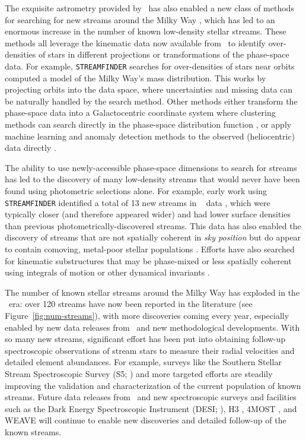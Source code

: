 \documentclass[final,5p,times,twocolumn,authoryear]{elsarticle}
\begin{document}
The exquisite astrometry provided by \gaia\ has also enabled a new class of methods for
searching for new streams around the Milky Way \citep[e.g.,][]{malhan:2018a,
borsato:2020, necib:2020, gatto:2020, shih:2022, shih:2023, pettee:2024}, which has led
to an enormous increase in the number of known low-density stellar streams.
These methods all leverage the kinematic data now available from \gaia\ to identify
over-densities of stars in different projections or transformations of the phase-space
data.
For example, \texttt{STREAMFINDER} \citep{malhan:2018a} searches for over-densities of
stars near orbits computed a model of the Milky Way's mass distribution.
This works by projecting orbits into the data space, where uncertainties and missing
data can be naturally handled by the search method.
Other methods either transform the phase-space data into a Galactocentric coordinate
system where clustering methods can search directly in the phase-space distribution
function \citep{necib:2020,gatto:2020}, or apply machine learning and anomaly detection
methods to the observed (heliocentric) data directly \citep{borsato:2020, shih:2022,
shih:2023, pettee:2024}.

The ability to use newly-accessible phase-space dimensions to search for streams has led
to the discovery of many low-density streams that would never have been found using
photometric selections alone.
For example, early work using \texttt{STREAMFINDER} identified a total of 13 new streams
in \gaia\  data \citep{malhan:2018, ibata:2018, ibata:2019}, which were typically
closer (and therefore appeared wider) and had lower surface densities than previous
photometrically-discovered streams.
This data has also enabled the discovery of streams that are not spatially coherent in
\emph{sky position} but do appear to contain comoving, metal-poor stellar populations
\citep[e.g.,][]{necib:2020b, balbinot:2023}.
Efforts have also searched for kinematic substructures that may be phase-mixed or less
spatially coherent using integrals of motion or other dynamical invariants
\citep[e.g.,][]{koppelman:2019b, yuan:2020, naidu:2020, ou:2023}.

The number of known stellar streams around the Milky Way has exploded in the \gaia\ era:
over 120 streams have now been reported in the literature (see
Figure~\ref{fig:num-streams}), with more discoveries coming every year, especially
enabled by new data releases from \gaia\ and new methodological developments.
With so many new streams, significant effort has been put into obtaining follow-up
spectroscopic observations of stream stars to measure their radial velocities and
detailed element abundances.
For example, surveys like the Southern Stellar Stream Spectroscopic Survey (S5;
\citep{li:2019,li:2022}) and more targeted efforts \citep[e.g.,][]{ibata:2021} are
steadily improving the validation and characterization of the current population of
known streams.
Future data releases from \gaia\ and new spectroscopic surveys and facilities such as
the Dark Energy Spectroscopic Instrument (DESI; \citealt{desi:2016}), H3
\citep{conroy:2019}, 4MOST \citep{4most:2012}, and WEAVE \citep{weave:2012} will
continue to enable new discoveries and detailed follow-up of the known streams.
\end{document}
